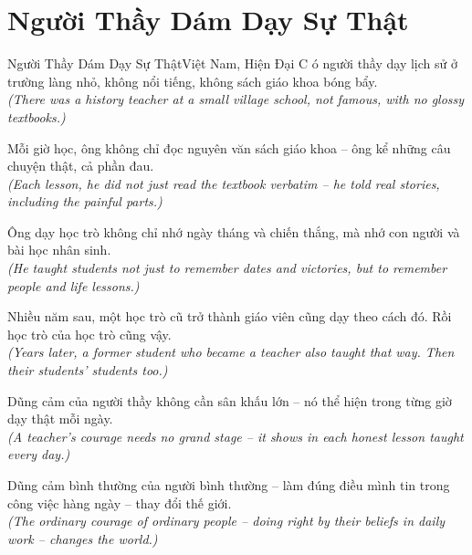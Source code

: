 \section{Người Thầy Dám Dạy Sự Thật}
\begin{truyen}{Người Thầy Dám Dạy Sự Thật}{Việt Nam, Hiện Đại}
C ó người thầy dạy lịch sử ở trường làng nhỏ, không nổi tiếng, không sách giáo khoa bóng bẩy.\\
\textit{(There was a history teacher at a small village school, not famous, with no glossy textbooks.)}

Mỗi giờ học, ông không chỉ đọc nguyên văn sách giáo khoa -- ông kể những câu chuyện thật, cả phần đau.\\
\textit{(Each lesson, he did not just read the textbook verbatim -- he told real stories, including the painful parts.)}

Ông dạy học trò không chỉ nhớ ngày tháng và chiến thắng, mà nhớ con người và bài học nhân sinh.\\
\textit{(He taught students not just to remember dates and victories, but to remember people and life lessons.)}

Nhiều năm sau, một học trò cũ trở thành giáo viên cũng dạy theo cách đó. Rồi học trò của học trò cũng vậy.\\
\textit{(Years later, a former student who became a teacher also taught that way. Then their students' students too.)}

Dũng cảm của người thầy không cần sân khấu lớn -- nó thể hiện trong từng giờ dạy thật mỗi ngày.\\
\textit{(A teacher's courage needs no grand stage -- it shows in each honest lesson taught every day.)}

\end{truyen}
\begin{baihoc}
  Dũng cảm bình thường của người bình thường -- làm đúng điều mình tin trong công việc hàng ngày -- thay đổi thế giới.\\
  \textit{(The ordinary courage of ordinary people -- doing right by their beliefs in daily work -- changes the world.)}
\end{baihoc}

